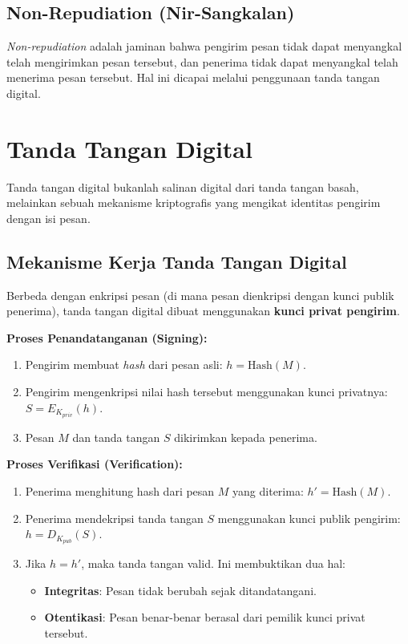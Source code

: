 \documentclass[../main.tex]{subfiles}
\begin{document}
\subsection{Non-Repudiation (Nir-Sangkalan)}
\textit{Non-repudiation} adalah jaminan bahwa pengirim pesan tidak dapat menyangkal telah mengirimkan pesan tersebut, dan penerima tidak dapat menyangkal telah menerima pesan tersebut. Hal ini dicapai melalui penggunaan tanda tangan digital.

\section{Tanda Tangan Digital}
Tanda tangan digital bukanlah salinan digital dari tanda tangan basah, melainkan sebuah mekanisme kriptografis yang mengikat identitas pengirim dengan isi pesan.

\subsection{Mekanisme Kerja Tanda Tangan Digital}
Berbeda dengan enkripsi pesan (di mana pesan dienkripsi dengan kunci publik penerima), tanda tangan digital dibuat menggunakan \textbf{kunci privat pengirim}.

\textbf{Proses Penandatanganan (Signing):}
\begin{enumerate}
    \item Pengirim membuat \textit{hash} dari pesan asli: $h = \text{Hash}(M)$.
    \item Pengirim mengenkripsi nilai hash tersebut menggunakan kunci privatnya: $S = E_{K_{priv}}(h)$.
    \item Pesan $M$ dan tanda tangan $S$ dikirimkan kepada penerima.
\end{enumerate}

\textbf{Proses Verifikasi (Verification):}
\begin{enumerate}
    \item Penerima menghitung hash dari pesan $M$ yang diterima: $h' = \text{Hash}(M)$.
    \item Penerima mendekripsi tanda tangan $S$ menggunakan kunci publik pengirim: $h = D_{K_{pub}}(S)$.
    \item Jika $h = h'$, maka tanda tangan valid. Ini membuktikan dua hal:
    \begin{itemize}
        \item \textbf{Integritas}: Pesan tidak berubah sejak ditandatangani.
        \item \textbf{Otentikasi}: Pesan benar-benar berasal dari pemilik kunci privat tersebut.
    \end{itemize}
\end{enumerate}
\end{document}
